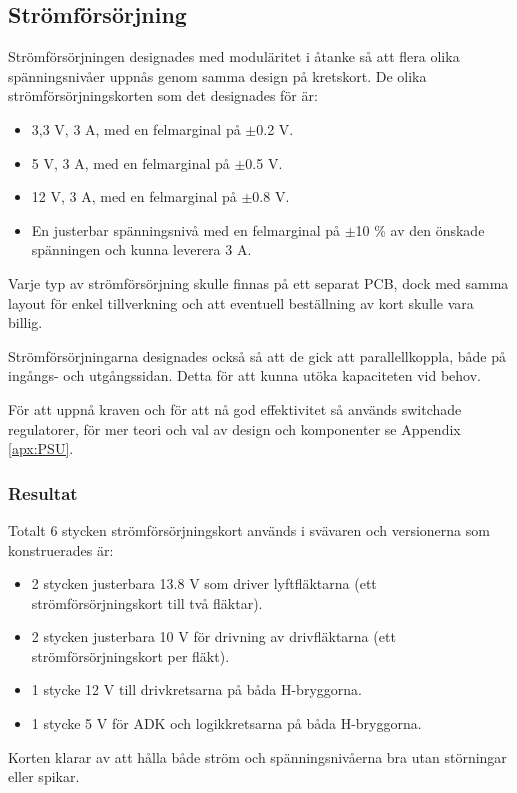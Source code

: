 \subsection{Strömförsörjning}
Strömförsörjningen designades med moduläritet i  åtanke så att flera olika
spänningsnivåer uppnås genom samma design på kretskort. De olika
strömförsörjningskorten som det designades för är:
\begin{itemize}
	\item 3,3 V, 3 A, med en felmarginal på $\pm$0.2 V.
	\item 5 V, 3 A, med en felmarginal på $\pm$0.5 V.
	\item 12 V, 3 A, med en felmarginal på $\pm$0.8 V.
	\item En justerbar spänningsnivå med en felmarginal på $\pm$10 \% av den
önskade spänningen och kunna leverera 3 A.
\end{itemize}

Varje typ av strömförsörjning skulle finnas på ett separat PCB, dock med samma
layout för enkel tillverkning och att eventuell beställning av kort skulle vara
billig.

Strömförsörjningarna designades också så att de gick att parallellkoppla, både
på ingångs- och utgångssidan. Detta för att kunna utöka kapaciteten vid behov.

För att uppnå kraven och för att nå god effektivitet så används switchade
regulatorer, för mer teori och val av design och komponenter se Appendix
\ref{apx:PSU}.

\subsubsection{Resultat}

Totalt 6 stycken strömförsörjningskort används i svävaren och versionerna som
konstruerades är:
\begin{itemize}
\item 2 stycken justerbara 13.8 V som driver lyftfläktarna (ett
strömförsörjningskort till två fläktar).
\item 2 stycken justerbara 10 V för drivning av drivfläktarna (ett
strömförsörjningskort per fläkt).
\item 1 stycke 12 V till drivkretsarna på båda H-bryggorna.
\item 1 stycke 5 V för ADK och logikkretsarna på båda H-bryggorna.
\end{itemize}

Korten klarar av att hålla både ström och spänningsnivåerna bra utan störningar
eller spikar.

